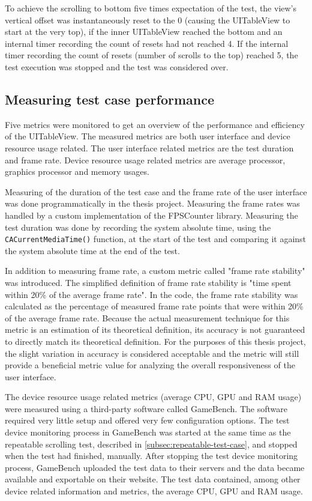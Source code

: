 \documentclass[a4paper,12pt]{article}
\begin{document}
To achieve the scrolling to bottom five times expectation of the test, the view's vertical offset was instantaneously reset to the 0 (causing the UITableView to start at the very top), if the inner UITableView reached the bottom and an internal timer recording the count of resets had not reached 4. If the internal timer recording the count of resets (number of scrolls to the top) reached 5, the test execution was stopped and the test was considered over.

\subsection{Measuring test case performance}
\label{subsec:measuring-test-case-performance}
Five metrics were monitored to get an overview of the performance and efficiency of the UITableView. The measured metrics are both user interface and device resource usage related. The user interface related metrics are the test duration and frame rate. Device resource usage related metrics are average processor, graphics processor and memory usages.

Measuring of the duration of the test case and the frame rate of the user interface was done programmatically in the thesis project. Measuring the frame rates was handled by a custom implementation of the FPSCounter\cite{FPSCounterGithub} library. Measuring the test duration was done by recording the system absolute time, using the \texttt{CACurrentMediaTime()} function, at the start of the test and comparing it against the system absolute time at the end of the test.

In addition to measuring frame rate, a custom metric called "frame rate stability" was introduced. The simplified definition of frame rate stability is "time spent within 20\% of the average frame rate". In the code, the frame rate stability was calculated as the percentage of measured frame rate points that were within 20\% of the average frame rate. Because the actual measurement technique for this metric is an estimation of its theoretical definition, its accuracy is not guaranteed to directly match its theoretical definition. For the purposes of this thesis project, the slight variation in accuracy is considered acceptable and the metric will still provide a beneficial metric value for analyzing the overall responsiveness of the user interface.

The device resource usage related metrics (average CPU, GPU and RAM usage) were measured using a third-party software called GameBench\cite{GameBenchHome}. The software required very little setup and offered very few configuration options. The test device monitoring process in GameBench was started at the same time as the repeatable scrolling test, described in \autoref{subsec:repeatable-test-case}, and stopped when the test had finished, manually. After stopping the test device monitoring process, GameBench uploaded the test data to their servers and the data became available and exportable on their website. The test data contained, among other device related information and metrics, the average CPU, GPU and RAM usage.
\end{document}
